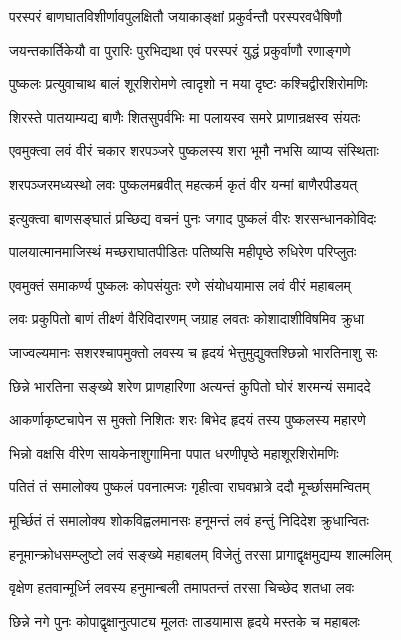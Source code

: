 \twolineshloka
{परस्परं बाणघातविशीर्णावपुलक्षितौ}
{जयाकाङ्क्षां प्रकुर्वन्तौ परस्परवधैषिणौ}%

\twolineshloka
{जयन्तकार्तिकेयौ वा पुरारिः पुरभिद्यथा}
{एवं परस्परं युद्धं प्रकुर्वाणौ रणाङ्गणे}%

\twolineshloka
{पुष्कलः प्रत्युवाचाथ बालं शूरशिरोमणे}
{त्वादृशो न मया दृष्टः कश्चिद्वीरशिरोमणिः}%

\twolineshloka
{शिरस्ते पातयाम्यद्य बाणैः शितसुपर्वभिः}
{मा पलायस्व समरे प्राणान्रक्षस्व संयतः}%

\twolineshloka
{एवमुक्त्वा लवं वीरं चकार शरपञ्जरे}
{पुष्कलस्य शरा भूमौ नभसि व्याप्य संस्थिताः}%

\twolineshloka
{शरपञ्जरमध्यस्थो लवः पुष्कलमब्रवीत्}
{महत्कर्म कृतं वीर यन्मां बाणैरपीडयत्}%

\twolineshloka
{इत्युक्त्वा बाणसङ्घातं प्रच्छिद्य वचनं पुनः}
{जगाद पुष्कलं वीरः शरसन्धानकोविदः}%

\twolineshloka
{पालयात्मानमाजिस्थं मच्छराघातपीडितः}
{पतिष्यसि महीपृष्ठे रुधिरेण परिप्लुतः}%

\twolineshloka
{एवमुक्तं समाकर्ण्य पुष्कलः कोपसंयुतः}
{रणे संयोधयामास लवं वीरं महाबलम्}%

\twolineshloka
{लवः प्रकुपितो बाणं तीक्ष्णं वैरिविदारणम्}
{जग्राह लवतः कोशादाशीविषमिव क्रुधा}%

\twolineshloka
{जाज्वल्यमानः सशरश्चापमुक्तो लवस्य च}
{हृदयं भेत्तुमुद्युक्तश्छिन्नो भारतिनाशु सः}%

\twolineshloka
{छिन्ने भारतिना सङ्ख्ये शरेण प्राणहारिणा}
{अत्यन्तं कुपितो घोरं शरमन्यं समाददे}%

\twolineshloka
{आकर्णाकृष्टचापेन स मुक्तो निशितः शरः}
{बिभेद हृदयं तस्य पुष्कलस्य महारणे}%

\twolineshloka
{भिन्नो वक्षसि वीरेण सायकेनाशुगामिना}
{पपात धरणीपृष्ठे महाशूरशिरोमणिः}%

\twolineshloka
{पतितं तं समालोक्य पुष्कलं पवनात्मजः}
{गृहीत्वा राघवभ्रात्रे ददौ मूर्च्छासमन्वितम्}%

\twolineshloka
{मूर्च्छितं तं समालोक्य शोकविह्वलमानसः}
{हनूमन्तं लवं हन्तुं निदिदेश क्रुधान्वितः}%

\twolineshloka
{हनूमान्क्रोधसम्प्लुष्टो लवं सङ्ख्ये महाबलम्}
{विजेतुं तरसा प्रागाद्वृक्षमुद्यम्य शाल्मलिम्}%

\twolineshloka
{वृक्षेण हतवान्मूर्ध्नि लवस्य हनुमान्बली}
{तमापतन्तं तरसा चिच्छेद शतधा लवः}%

\twolineshloka
{छिन्ने नगे पुनः कोपाद्वृक्षानुत्पाट्य मूलतः}
{ताडयामास हृदये मस्तके च महाबलः}%

